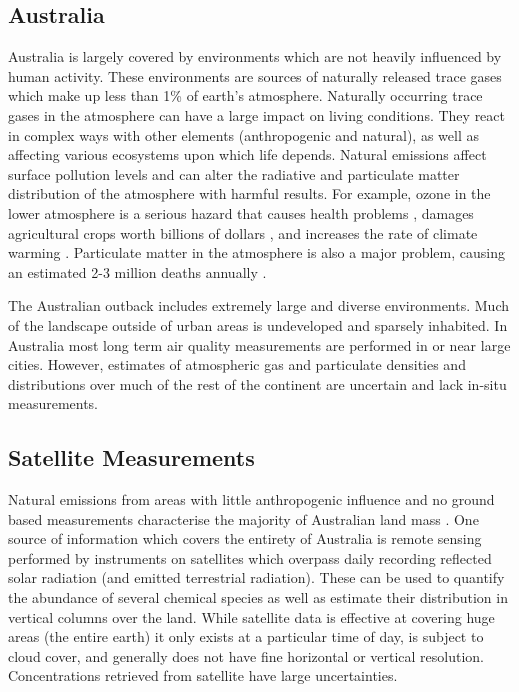  \subsection{Australia}

    Australia is largely covered by environments which are not heavily influenced by human activity.
    These environments are sources of naturally released trace gases which make up less than 1\% of earth's atmosphere.
    Naturally occurring trace gases in the atmosphere can have a large impact on living conditions.
    They react in complex ways with other elements (anthropogenic and natural), as well as affecting various ecosystems upon which life depends.
    Natural emissions affect surface pollution levels and can alter the radiative and particulate matter distribution of the atmosphere with harmful results.
    For example, ozone in the lower atmosphere is a serious hazard that causes health problems \citep{Hsieh_2013}, damages agricultural crops worth billions of dollars \citep{Avnery2011}, and increases the rate of climate warming \citep{IPCC_2013_chap8}.
    Particulate matter in the atmosphere is also a major problem, causing an estimated 2-3 million deaths annually \citep{Hoek_2013, Krewski_2009, Silva_2013, Lelieveld_2015}.

    The Australian outback includes extremely large and diverse environments.
    Much of the landscape outside of urban areas is undeveloped and sparsely inhabited.
    In Australia most long term air quality measurements are performed in or near large cities.
    However, estimates of atmospheric gas and particulate densities and distributions over much of the rest of the continent are uncertain and lack in-situ measurements.

  \subsection{Satellite Measurements}

    Natural emissions from areas with little anthropogenic influence and no ground based measurements characterise the majority of Australian land mass \citep{VanDerA2008}.
    One source of information which covers the entirety of Australia is remote sensing performed by instruments on satellites which overpass daily recording reflected solar radiation (and emitted terrestrial radiation).
    These can be used to quantify the abundance of several chemical species as well as estimate their distribution in vertical columns over the land.
    While satellite data is effective at covering huge areas (the entire earth) it only exists at a particular time of day, is subject to cloud cover, and generally does not have fine horizontal or vertical resolution.
    Concentrations retrieved from satellite have large uncertainties.

